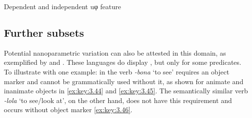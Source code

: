 \documentclass[output=paper]{langsci/langscibook}
\begin{document}
\ea\label{ex:key:3.43} \label{bkm:Ref373481316}
    Dependent and independent uφ feature \\
\z

\subsection{Further subsets}\label{sub:3.3.4}

Potential nanoparametric variation can also be attested in this domain, as
exemplified by  and . These languages do display ,
but only for some predicates. To illustrate with one example: in  the
verb \emph{-bona} ‘to see’ requires an object marker and cannot be
grammatically used without it, as shown for animate and inanimate objects in
\eqref{ex:key:3.44} and \eqref{ex:key:3.45}. The semantically similar verb \emph{-lola}
‘to see/look at’, on the other hand, does not have this requirement and occurs
without object marker \eqref{ex:key:3.46}.
\end{document}
